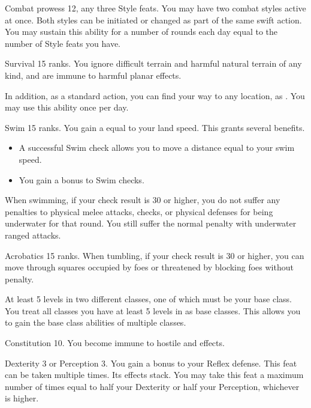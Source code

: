 \featpres Combat prowess 12, any three Style feats.
\featben You may have two combat styles active at once.
Both styles can be initiated or changed as part of the same swift action.
You may sustain this ability for a number of rounds each day equal to the number of Style feats you have.

\featpre Survival 15 ranks.
\featben You ignore difficult terrain and harmful natural terrain of any kind, and are immune to harmful planar effects.

In addition, as a standard action, you can find your way to any location, as .
You may use this ability once per day.

\featpre Swim 15 ranks.
\featben You gain a  equal to your land speed.
This grants several benefits.
\begin{itemize}
    \item A successful Swim check allows you to move a distance equal to your swim speed.
    \item You gain a  bonus to Swim checks.
\end{itemize}

When swimming, if your check result is 30 or higher, you do not suffer any penalties to physical melee attacks, checks, or physical defenses for being underwater for that round.
You still suffer the normal penalty with underwater ranged attacks.

\featpre Acrobatics 15 ranks.
\featben When tumbling, if your check result is 30 or higher, you can move through squares occupied by foes or threatened by blocking foes without penalty.

\featpre At least 5 levels in two different classes, one of which must be your base class.
\featben You treat all classes you have at least 5 levels in as base classes.
This allows you to gain the base class abilities of multiple classes.

\featpre Constitution 10.
\featben You become immune to hostile  and  effects.

\featpre Dexterity 3 or Perception 3.
\featben You gain a  bonus to your Reflex defense.
 This feat can be taken multiple times. Its effects stack.
You may take this feat a maximum number of times equal to half your Dexterity or half your Perception, whichever is higher.

